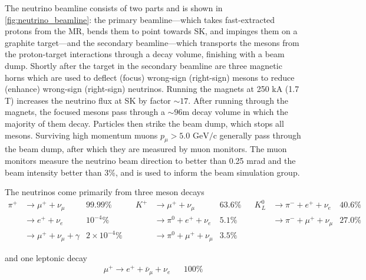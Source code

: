 The neutrino beamline consists of two parts and is shown in \autoref{fig:neutrino_beamline}: the primary beamline---which takes fast-extracted protons from the MR, bends them to point towards SK, and impinges them on a graphite target---and the secondary beamline---which transports the mesons from the proton-target interactions through a decay volume, finishing with a beam dump. Shortly after the target in the secondary beamline are three magnetic horns\cite{t2k_horns} which are used to deflect (focus) wrong-sign (right-sign) mesons to reduce (enhance) wrong-sign (right-sign) neutrinos. Running the magnets at 250 kA (1.7 T) increases the neutrino flux at SK by factor $\sim17$\cite{t2k_beam}. After running through the magnets, the focused mesons pass through a $\sim96$m decay volume in which the majority of them decay. Particles then strike the beam dump, which stops all mesons. Surviving high momentum muons $p_\mu > 5.0 \text{ GeV/c}$ generally pass through the beam dump, after which they are measured by muon monitors. The muon monitors measure the neutrino beam direction to better than 0.25 mrad and the beam intensity better than 3\%\cite{t2k_mumon,t2k_mumon2}, and is used to inform the beam simulation group.

The neutrinos come primarily from three meson decays
\begin{align*}
	\pi^+ & \rightarrow \mu^+ + \nu_\mu 		&  99.99\% 			& & K^+ & \rightarrow \mu^+ + \nu_\mu 			& 63.6\% & & K^0_L & \rightarrow \pi^- + e^+ + \nu_e 	  & 40.6\% \\
	      & \rightarrow e^+ + \nu_e 			&  10^{-4}\%		& &		& \rightarrow \pi^0 + e^+ + \nu_e 		& 5.1\%  & &	   & \rightarrow \pi^- + \mu^+ + \nu_\mu &  27.0\% \\
	      & \rightarrow \mu^+ + \nu_\mu + \gamma & 2\times 10^{-4}\%  & &		& \rightarrow \pi^0 + \mu^+ + \nu_\mu  	& 3.5\%  & &	   & & 		 &
\end{align*}

and one leptonic decay\cite{pdg_2017}
\begin{align*}
\mu^+ \rightarrow e^+ + \bar{\nu}_\mu + \nu_e & & 100\%
\end{align*}

